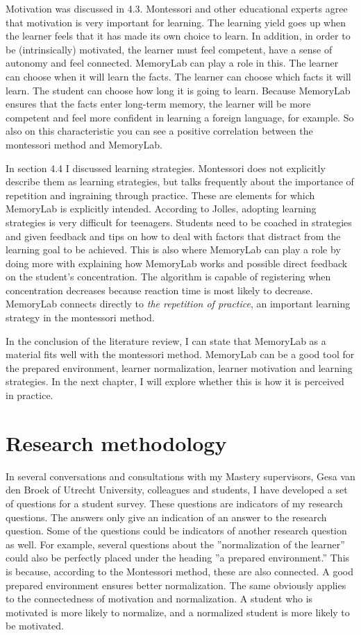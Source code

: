 \documentclass[12pt, a4paper]{article}
\begin{document}
Motivation was discussed in 4.3. Montessori and other educational experts agree that motivation is very important for learning. The learning yield goes up when the learner feels that it has made its own choice to learn. In addition, in order to be (intrinsically) motivated, the learner must feel competent, have a sense of autonomy and feel connected. MemoryLab can play a role in this. The learner can choose when it will learn the facts. The learner can choose which facts it will learn. The student can choose how long it is going to learn. Because MemoryLab ensures that the facts enter long-term memory, the learner will be more competent and feel more confident in learning a foreign language, for example. So also on this characteristic you can see a positive correlation between the montessori method and MemoryLab.

In section 4.4 I discussed learning strategies. Montessori does not explicitly describe them as learning strategies, but talks frequently about the importance of repetition and ingraining through practice. These are elements for which MemoryLab is explicitly intended. According to Jolles, adopting learning strategies is very difficult for teenagers. Students need to be coached in strategies and given feedback and tips on how to deal with factors that distract from the learning goal to be achieved. This is also where MemoryLab can play a role by doing more with explaining how MemoryLab works and possible direct feedback on the student's concentration. The algorithm is capable of registering when concentration decreases because reaction time is most likely to decrease. MemoryLab connects directly to \emph{the repetition of practice}, an important learning strategy in the montessori method.

In the conclusion of the literature review, I can state that MemoryLab as a material fits well with the montessori method. MemoryLab can be a good tool for the prepared environment, learner normalization, learner motivation and learning strategies. In the next chapter, I will explore whether this is how it is perceived in practice.
\newpage
\section{Research methodology}
In several conversations and consultations with my Mastery supervisors, Gesa van den Broek of Utrecht University, colleagues and students, I have developed a set of questions for a student survey. These questions are indicators of my research questions. The answers only give an indication of an answer to the research question. Some of the questions could be indicators of another research question as well. For example, several questions about the ''normalization of the learner'' could also be perfectly placed under the heading ''a prepared environment.'' This is because, according to the Montessori method, these are also connected. A good prepared environment ensures better normalization. The same obviously applies to the connectedness of motivation and normalization. A student who is motivated is more likely to normalize, and a normalized student is more likely to be motivated.
\end{document}
